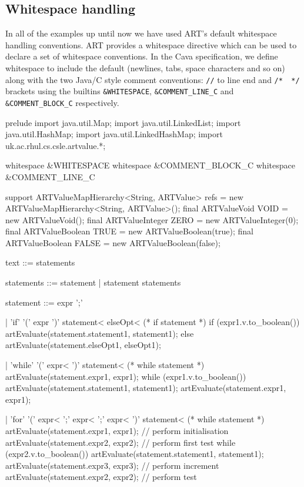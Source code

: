 \subsection{Whitespace handling}
In all of the examples up until now we have used ART's default whitespace handling conventions. ART provides a {\sf whitespace} directive which can be used to declare a set of whitespace conventions. In the Cava specification, we define whitespace to include the default (newlines, tabs, space characters and so on) along with the two Java/C style comment conventions: \verb+//+ to line end and \verb+/*  */+ brackets using the builtins \verb+&WHITESPACE+, \verb+&COMMENT_LINE_C+ and \verb+&COMMENT_BLOCK_C+ respectively.

\begin{codeblock}
prelude 
{ import java.util.Map;
  import java.util.LinkedList;
  import java.util.HashMap;
  import java.util.LinkedHashMap;
  import uk.ac.rhul.cs.csle.artvalue.*; }

whitespace &WHITESPACE
whitespace &COMMENT_BLOCK_C
whitespace &COMMENT_LINE_C 

support 
{ ARTValueMapHierarchy<String, ARTValue> refs = 
     new ARTValueMapHierarchy<String, ARTValue>(); 
  final ARTValueVoid VOID = new ARTValueVoid(); 
  final ARTValueInteger ZERO = new ARTValueInteger(0); 
  final ARTValueBoolean TRUE = new ARTValueBoolean(true); 
  final ARTValueBoolean FALSE = new ARTValueBoolean(false); }

text ::= statements

statements ::= statement | statement statements  

statement ::= expr ';' 

  | 'if' '(' expr ')' statement< elseOpt<     (* if statement *)
  { if (expr1.v.to_boolean()) artEvaluate(statement.statement1, statement1); 
  else artEvaluate(statement.elseOpt1, elseOpt1); }     

  | 'while' '(' expr< ')' statement<          (* while statement *)
  { artEvaluate(statement.expr1, expr1); 
    while (expr1.v.to_boolean()) { 
      artEvaluate(statement.statement1, statement1); 
      artEvaluate(statement.expr1, expr1); } }  

  | 'for' '(' expr< ';' expr< ';' expr< ')' statement<  (* while statement *)
  { artEvaluate(statement.expr1, expr1);        // perform initialisation
    artEvaluate(statement.expr2, expr2);        // perform first test
    while (expr2.v.to_boolean()) { 
      artEvaluate(statement.statement1, statement1); 
      artEvaluate(statement.expr3, expr3);      // perform increment 
      artEvaluate(statement.expr2, expr2); } }  // perform test       


\end{codeblock}
